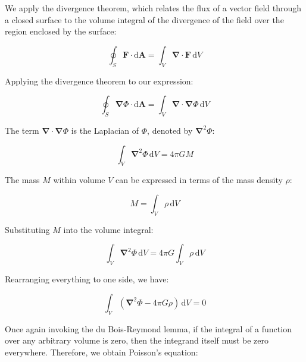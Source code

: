 \documentclass[notoc]{tufte-handout}
\renewcommand{\vec}[1]{\mathbf{#1}}
\newcommand{\del}{\vec{\nabla}}
\begin{document}
We apply the divergence theorem, which relates the flux of a vector field through a closed surface to the volume integral of the divergence of the field over the region enclosed by the surface:

\begin{equation}
\oint_S \mathbf{F} \cdot \mathrm{d}\mathbf{A} = \int_V \del \cdot \mathbf{F} \, \mathrm{d}V
\end{equation}

Applying the divergence theorem to our expression:

\begin{equation}
\oint_S \del \Phi \cdot \mathrm{d}\mathbf{A} = \int_V \del \cdot \del \Phi \, \mathrm{d}V
\end{equation}

The term $\del \cdot \del \Phi$ is the Laplacian of $\Phi$, denoted by $\del^2 \Phi$:

\begin{equation}
\int_V \del^2 \Phi \, \mathrm{d}V = 4 \pi G M
\end{equation}

The mass $M$ within volume $V$ can be expressed in terms of the mass density $\rho$:

\begin{equation}
M = \int_V \rho \, \mathrm{d}V
\end{equation}

Substituting $M$ into the volume integral:

\begin{equation}
\int_V \del^2 \Phi \, \mathrm{d}V = 4 \pi G \int_V \rho \, \mathrm{d}V
\end{equation}

Rearranging everything to one side, we have:

\begin{equation}
\int_V (\del^2 \Phi - 4 \pi G \rho) \, \mathrm{d}V = 0
\end{equation}

Once again invoking  the du Bois-Reymond lemma, if the integral of a function over any arbitrary volume is zero, then the integrand itself must be zero everywhere. Therefore, we obtain Poisson's equation:
\end{document}
